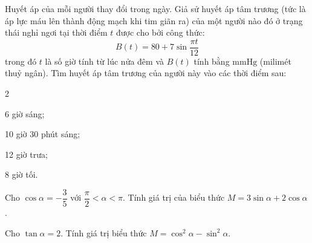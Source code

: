 \begin{vd}
	Huyết áp của mỗi người thay đổi trong ngày. Giả sử huyết áp tâm trương (tức là áp lực máu lên thành động mạch khi tim giãn ra) của một người nào đó ở trạng thái nghỉ ngơi tại thời điểm $t$ được cho bởi công thức:
	$$
	B(t)=80+7 \sin \frac{\pi t}{12}
	$$
	trong đó $t$ là số giờ tính từ lúc nửa đêm và $B(t)$ tính bằng $\mathrm{mmHg}$ (milimét thuỷ ngân). Tìm huyết áp tâm trương của người này vào các thời điểm sau:
	\begin{enumEX}[a)]{2}
		\item 6 giờ sáng;
		\item 10 giờ 30 phút sáng;
		\item 12 giờ trưa;
		\item 8 giờ tối.
	\end{enumEX}
\end{vd} 

\begin{vd}%
	Cho $\cos \alpha=-\dfrac{3}{5}$ với $\dfrac{\pi}{2}<\alpha<\pi$. Tính giá trị của biểu thức $M=3\sin\alpha+2\cos\alpha$.
\end{vd} 

\begin{vd}%
	Cho $\tan \alpha=2$. Tính giá trị biểu thức $M=\cos^2\alpha-\sin^2\alpha$.
\end{vd} 

